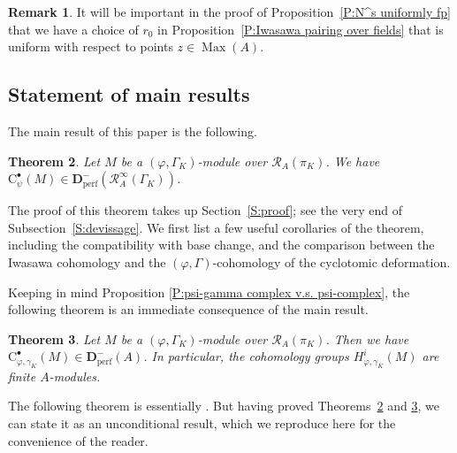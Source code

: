 \documentclass[12pt]{article}
\newtheorem{theorem}{Theorem}[subsection]
\theoremstyle{definition}
\newtheorem{remark}[theorem]{Remark}
\numberwithin{equation}{theorem}
\newcommand{\calR}{\mathcal{R}}
\newcommand{\bbD}{\mathbf{D}}
\newcommand{\rmC}{\mathrm{C}}
\newcommand{\perf}{\mathrm{perf}}
\DeclareMathOperator{\Max}{Max}
\begin{document}
\begin{remark}
It will be important in the proof of Proposition~\ref{P:N^s uniformly fp} that we have a choice of $r_0$ in Proposition~\ref{P:Iwasawa pairing over fields} that is uniform with respect to points $z \in \Max(A)$.
\end{remark}

\subsection{Statement of main results}
\label{S:statement of main results}

The main result of this paper is the following.

\begin{theorem}
\label{T:finite Iwasawa cohomology}
Let $M$ be a $(\varphi, \Gamma_K)$-module
over $\calR_A(\pi_K)$.  We have $\rmC^\bullet_\psi(M) \in \bbD_\perf^- (\calR_A^\infty(\Gamma_K))$.
\end{theorem}

The proof of this theorem takes up Section~\ref{S:proof}; see the very end of Subsection~\ref{S:devissage}. 
We first list a few useful corollaries of the theorem, including the compatibility with base change, and the comparison between the Iwasawa cohomology and the $(\varphi, \Gamma)$-cohomology of the cyclotomic deformation.

Keeping in mind Proposition \ref{P:psi-gamma complex v.s. psi-complex}, the following theorem is an immediate consequence of the main result.

\begin{theorem}
\label{T:finite cohomology 1}
Let $M$ be a $(\varphi,\Gamma_K)$-module over $\calR_A(\pi_K)$.  Then we have $\rmC_{\varphi,\gamma_K}^\bullet(M) \in \bbD_\perf^-(A)$.  In particular, the cohomology groups $H_{\varphi,\gamma_K}^i(M)$ are finite $A$-modules.
\end{theorem}


The following theorem is essentially \cite[Proposition~2.6]{pottharst1}. But having proved Theorems~\ref{T:finite Iwasawa cohomology} and \ref{T:finite cohomology 1}, we can state it as an unconditional result, which we reproduce here for the convenience of the reader.
\end{document}
